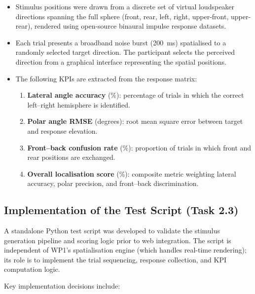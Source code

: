 \begin{itemize}
    \item Stimulus positions were drawn from a discrete set of virtual loudspeaker
    directions spanning the full sphere (front, rear, left, right, upper-front, upper-rear),
    rendered using open-source binaural impulse response datasets.
    \item Each trial presents a broadband noise burst (200~ms) spatialised to a randomly
    selected target direction. The participant selects the perceived direction from a
    graphical interface representing the spatial positions.
    \item The following KPIs are extracted from the response matrix:
    \begin{enumerate}
        \item \textbf{Lateral angle accuracy} (\%): percentage of trials in which the
        correct left–right hemisphere is identified.
        \item \textbf{Polar angle RMSE} (degrees): root mean square error between
        target and response elevation.
        \item \textbf{Front–back confusion rate} (\%): proportion of trials in which
        front and rear positions are exchanged.
        \item \textbf{Overall localisation score} (\%): composite metric weighting
        lateral accuracy, polar precision, and front–back discrimination.
    \end{enumerate}
\end{itemize}

\subsection{Implementation of the Test Script (Task 2.3)}

A standalone Python test script was developed to validate the stimulus generation pipeline
and scoring logic prior to web integration. The script is independent of WP1's
spatialisation engine (which handles real-time rendering); its role is to implement the
trial sequencing, response collection, and KPI computation logic.

Key implementation decisions include:

